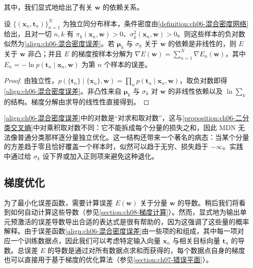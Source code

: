 \documentclass[../../main.tex]{subfiles}
\begin{document}
其中，我们显式地给出了有关 $\boldsymbol{w}$ 的依赖关系。

\begin{proposition}\label{proposition:ch06-MDN误差}
设 $\{(\boldsymbol{x}_{n},\boldsymbol{t}_{n})\}_{n=1}^{N}$ 为独立同分布样本，条件密度由\cref{definition:ch06-混合密度网络}给出，且对一切 $n,k$ 有 $\pi_{k}(\boldsymbol{x}_{n},\boldsymbol{w})>0$、$\sigma_{k}^{2}(\boldsymbol{x}_{n},\boldsymbol{w})>0$。则这些样本的负对数似然为\eqref{align:ch06-混合密度误差}。若 $\boldsymbol{\mu}_{k}$ 与 $\sigma_{k}$ 关于 $\boldsymbol{w}$ 的依赖是非线性的，则 $E$ 关于 $\boldsymbol{w}$ 非凸；并且 $E$ 的梯度按样本分解为 $\nabla E(\boldsymbol{w})=\sum_{n=1}^{N}\nabla E_{n}(\boldsymbol{w})$，其中 $E_{n}=-\ln p(\boldsymbol{t}_{n}\mid\boldsymbol{x}_{n},\boldsymbol{w})$ 为第 $n$ 个样本的误差。
\end{proposition}

\begin{proof}
由独立性，$p(\{\boldsymbol{t}_n\}\mid\{\boldsymbol{x}_n\},\boldsymbol{w})=\prod_{n}p(\boldsymbol{t}_n\mid\boldsymbol{x}_n,\boldsymbol{w})$，取负对数即得\eqref{align:ch06-混合密度误差}。非凸性来自 $\boldsymbol{\mu}_k$ 与 $\sigma_k$ 对 $\boldsymbol{w}$ 的非线性依赖以及 $\ln\sum_k$ 的结构。梯度分解由求导的线性性直接得到。
\end{proof}

\begin{remark}\eqref{align:ch06-混合密度误差}中的对数是“对求和取对数”，这与\cref{proposition:ch06-二分类交叉熵}中对乘积取对数不同：它不能拆成每个分量的损失之和，因此 MDN 无法像普通分类那样逐分量独立优化。这一结构还带来一个著名的病态：当某个分量的方差趋于零且恰好覆盖一个样本时，似然可以趋于无穷、损失趋于 $-\infty$。实践中通过给 $\sigma_k$ 设下界或加入正则项来避免这种退化。
\end{remark}

\subsection{梯度优化}\label{subsection:ch06-梯度优化}

为了最小化误差函数，需要计算误差 $E(\boldsymbol{w})$ 关于分量 $\boldsymbol{w}$ 的导数。稍后我们将看到如何自动计算这些导数（参见\cref{section:ch08-梯度计算}）。然而，显式地为输出单元预激活的误差导数导出合适的表达式是很有帮助的，因为这强调了这些量的概率解释。由于误差函数\eqref{align:ch06-混合密度误差}由一些项的和组成，其中每一项对应一个训练数据点，因此我们可以考虑特定输入向量 $\boldsymbol{x}_n$ 与相关目标向量 $\boldsymbol{t}_n$ 的导数。总误差 $E$ 的导数是通过对所有数据点求和而获得的，每个数据点自身的梯度也可以直接用于基于梯度的优化算法（参见\cref{section:ch07-错误平面}）。
\end{document}
